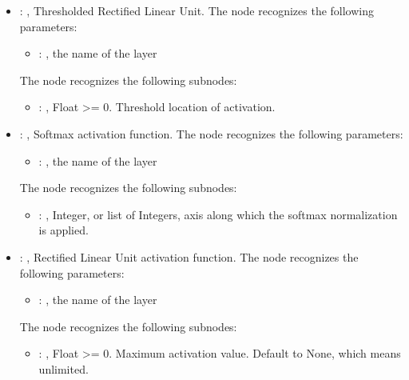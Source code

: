 \begin{itemize}
    \item {}: , 
      Thresholded Rectified Linear Unit.
      The  node recognizes the following parameters:
        \begin{itemize}
          \item {}: , 
            the name of the layer
      \end{itemize}

      The  node recognizes the following subnodes:
      \begin{itemize}
        \item {}: , 
          Float >= 0. Threshold location of activation.
      \end{itemize}

    \item {}: , 
      Softmax activation function.
      The  node recognizes the following parameters:
        \begin{itemize}
          \item {}: , 
            the name of the layer
      \end{itemize}

      The  node recognizes the following subnodes:
      \begin{itemize}
        \item {}: , 
          Integer, or list of Integers, axis along which the softmax normalization is applied.
      \end{itemize}

    \item {}: , 
      Rectified Linear Unit activation function.
      The  node recognizes the following parameters:
        \begin{itemize}
          \item {}: , 
            the name of the layer
      \end{itemize}

      The  node recognizes the following subnodes:
      \begin{itemize}
        \item {}: , 
          Float >= 0. Maximum activation value. Default to None, which means unlimited.


\end{itemize}
\end{itemize}
